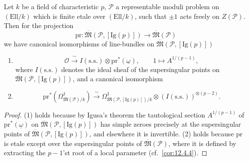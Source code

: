 \begin{kcor}\label{cor:12.8.6}
Let $k$ be a field of characteristic $p$, $\mathcal{P}$ a representable moduli problem on $(\mathrm{Ell}/k)$ which is finite etale over $(\mathrm{Ell}/k)$, such that $\pm 1$ acts freely on $Z(\mathcal{P})$. Then for the projection
\[
\mathrm{pr} : \overline{\mathfrak{M}}(\mathcal{P}, [\mathrm{Ig}(p)]) \to \overline{\mathfrak{M}}(\mathcal{P})
\]
we have canonical isomorphisms of line-bundles on $\overline{\mathfrak{M}}(\mathcal{P}, [\mathrm{Ig}(p)])$
\begin{enumerate}[label=(\arabic*)]
\item
\[
\mathcal{O} \xrightarrow{\ \sim\ } I(\mathrm{s.s.}) \otimes \mathrm{pr}^*(\underline{\omega}) , \qquad 1 \mapsto A^{1/(p-1)} ,
\]
where $I(\mathrm{s.s.})$ denotes the ideal sheaf of the supersingular points on $\overline{\mathfrak{M}}(\mathcal{P}, [\mathrm{Ig}(p)])$, and a canonical isomorphism
\item
\[
\mathrm{pr}^*(\Omega^1_{\overline{\mathfrak{M}}(\mathcal{P})/k}) \xrightarrow{\ \sim\ } \Omega^1_{\overline{\mathfrak{M}}(\mathcal{P}, [\mathrm{Ig}(p)])/k} \otimes (I(\mathrm{s.s.}))^{\otimes(p-2)} .
\]
\end{enumerate}
\end{kcor}

\begin{proof}
(1) holds because by Igusa's theorem the tautological section $A^{1/(p-1)}$ of $\mathrm{pr}^*(\underline{\omega})$ on $\overline{\mathfrak{M}}(\mathcal{P}, [\mathrm{Ig}(p)])$ has simple zeroes precisely at the supersingular points of $\overline{\mathfrak{M}}(\mathcal{P}, [\mathrm{Ig}(p)])$, and elsewhere it is invertible. (2) holds because $\mathrm{pr}$ is etale except over the supersingular points of $\overline{\mathfrak{M}}(\mathcal{P})$, where it is defined by extracting the $p-1$'st root of a local parameter (cf.~\ref{cor:12.4.4}).
\end{proof}

